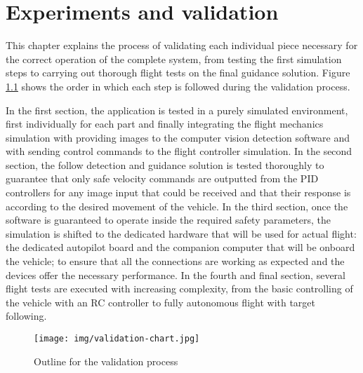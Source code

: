 \chapter{Experiments and validation}
\label{chap:validation}

This chapter explains the process of validating each individual piece necessary for the correct operation of the complete system, from testing the first simulation steps to carrying out thorough flight tests on the final guidance solution.
Figure \ref{fig:validation-chart} shows the order in which each step is followed during the validation process.

In the first section, the application is tested in a purely simulated environment, first individually for each part and finally integrating the flight mechanics simulation with providing images to the computer vision detection software and with sending control commands to the flight controller simulation.
In the second section, the follow detection and guidance solution is tested thoroughly to guarantee that only safe velocity commands are outputted from the PID controllers for any image input that could be received and that their response is according to the desired movement of the vehicle.
In the third section, once the software is guaranteed to operate inside the required safety parameters, the simulation is shifted to the dedicated hardware that will be used for actual flight: the dedicated autopilot board and the companion computer that will be onboard the vehicle; to ensure that all the connections are working as expected and the devices offer the necessary performance.
In the fourth and final section, several flight tests are executed with increasing complexity, from the basic controlling of the vehicle with an RC controller to fully autonomous flight with target following.

\begin{figure}
  \centering
  \texttt{[image: img/validation-chart.jpg]}
  \caption{Outline for the validation process}\label{fig:validation-chart}
\end{figure}





